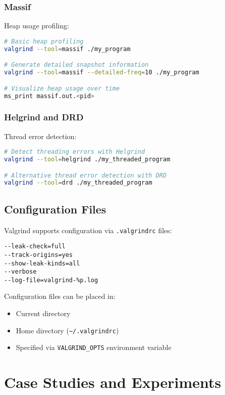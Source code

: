 \documentclass[11pt,a4paper]{article}
\begin{document}
\subsubsection{Massif}
Heap usage profiling:

\begin{lstlisting}[caption=Using Massif for heap profiling, language=bash]
# Basic heap profiling
valgrind --tool=massif ./my_program

# Generate detailed snapshot information
valgrind --tool=massif --detailed-freq=10 ./my_program

# Visualize heap usage over time
ms_print massif.out.<pid>
\end{lstlisting}

\subsubsection{Helgrind and DRD}
Thread error detection:

\begin{lstlisting}[caption=Using Helgrind for thread error detection, language=bash]
# Detect threading errors with Helgrind
valgrind --tool=helgrind ./my_threaded_program

# Alternative thread error detection with DRD
valgrind --tool=drd ./my_threaded_program
\end{lstlisting}

\subsection{Configuration Files}
Valgrind supports configuration via \texttt{.valgrindrc} files:

\begin{lstlisting}[caption=Example .valgrindrc file]
--leak-check=full
--track-origins=yes
--show-leak-kinds=all
--verbose
--log-file=valgrind-%p.log
\end{lstlisting}

Configuration files can be placed in:
\begin{itemize}
    \item Current directory
    \item Home directory (\texttt{\~{}/.valgrindrc})
    \item Specified via \texttt{VALGRIND\_OPTS} environment variable
\end{itemize}

\section{Case Studies and Experiments}
\end{document}
